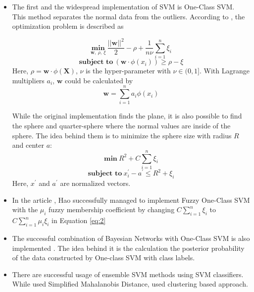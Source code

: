 \documentclass[paper=8.27in:11.69in, 11pt]{scrartcl}
\begin{document}
\begin{itemize}
\item The first and the widespread implementation of SVM is One-Class SVM. This method separates the normal data from the outliers. According to \cite{scholkopf2001estimating}, the optimization problem is described as

\begin{equation}
\underset{\mathbf{w}, \ \rho, \ \xi}{\textbf{min}} \ \frac{{||\mathbf{w}||}^{2}}{2}-\rho+\frac{1}{n\nu}\sum_{i=1}^{n}\xi_{i}
\end{equation}
\begin{equation}
\textbf{subject to} \ (\mathbf{w} \cdot \phi(x_{i})) \geq \rho-\xi
\end{equation}
Here, $\rho = \mathbf{w} \cdot \phi(\mathbf{X})$, $\nu$ is the hyper-parameter with $\nu \in (0,1]$. With Lagrange multipliers $a_{i}$, $\mathbf{w}$ could be calculated by
\begin{equation}
\mathbf{w} = \sum_{i=1}^{n}a_{i}\phi(x_{i})
\end{equation}

While the original implementation finds the plane, it is also possible to find the sphere \cite{tax1999data}\cite{tax2004support} and quarter-sphere \cite{laskov2004intrusion} where the normal values are inside of the sphere. The idea behind them is to minimize the sphere size with radius $R$ and center $a$:
\begin{equation}
\textbf{min} \ R^{2} + C\sum_{i=1}^{n} \xi_{i}
\end{equation}
\begin{equation}
\textbf{subject to} \ x_{i}^{'}-a^{'} \leq R^{2}+\xi_{i}
\end{equation}
Here, $x^{'}$ and $a^{'}$ are normalized vectors.

\item In the article \cite{hao2008fuzzy}, Hao successfully managed to implement Fuzzy One-Class SVM with the $\mu_{i}$ fuzzy membership coefficient by changing $C\sum_{i=1}^{n}\xi_{i}$ to $C\sum_{i=1}^{n}\mu_{i}\xi_{i}$ in Equation \ref{eq:2} 
\item The successful combination of Bayesian Networks with One-Class SVM is also implemented \cite{sotiris2010anomaly}. The idea behind it is the calculation the posterior probability of the data constructed by One-class SVM with class labels.
\item There are successful usage of ensemble SVM methods using SVM classifiers. While \cite{perdisci2006using} used Simplified Mahalanobis Distance, \cite{song2009unsupervised} used clustering based approach.
\end{itemize}
\end{document}
